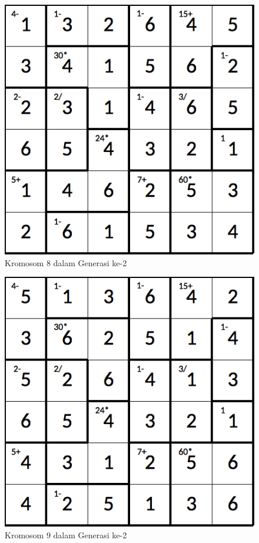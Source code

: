 \begin{figure}
\centering
\captionsetup{justification=centering}
\includegraphics[scale=0.333]{Gambar/hybridgenetic/Generation2Chromosome8}
\caption[Kromosom 8 dalam Generasi ke-2]{Kromosom 8 dalam Generasi ke-2}
\label{fig:analisisg2k8}
\end{figure}

\begin{figure}
\centering
\captionsetup{justification=centering}
\includegraphics[scale=0.333]{Gambar/hybridgenetic/Generation2Chromosome9}
\caption[Kromosom 9 dalam Generasi ke-2]{Kromosom 9 dalam Generasi ke-2}
\label{fig:analisisg2k9}
\end{figure}

